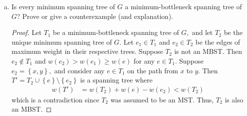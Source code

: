 \documentclass{article}
\begin{document}
\begin{enumerate}[(a), resume]
	\item Is every minimum spanning tree of $G$ a minimum-bottleneck spanning tree of $G$?  Prove or give a counterexample (and explanation).
		\begin{proof}
			Let $T_1$ be a minimum-bottleneck spanning tree of $G,$ and let $T_2$ be the unique minimum spanning tree of $G.$ Let $e_1\in T_1$ and $e_2\in T_2$ be the edges of maximum weight in their respective trees. Suppose $T_2$ is not an MBST. Then $e_2\notin T_1$ and $w(e_2)>w(e_1)\ge w(e)$ for any $e\in T_1.$ Suppose $e_2=\left\{ x, y \right\},$ and consider any $e\in T_1$ on the path from $x$ to $y.$ Then $T'=T_2\cup\left\{ e \right\}\setminus\left\{ e_2 \right\}$ is a spanning tree where
			\begin{align*}
				w(T') &= w(T_2) + w(e) - w(e_2) < w(T_2) 
			\end{align*}
			which is a contradiction since $T_2$ was assumed to be an MST. Thus, $T_2$ is also an MBST.
		\end{proof}
\end{enumerate}

\newpage
\end{document}
